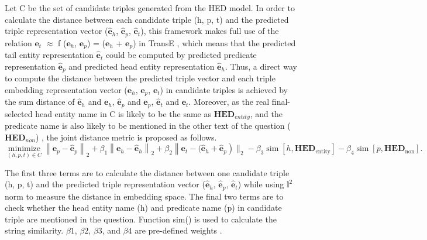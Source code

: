 \documentclass[11pt]{article}
\begin{document}
Let C be the set of candidate triples generated from the HED model. In order to calculate the distance between each candidate triple (h, p, t) and the predicted triple representation vector ($\hat{\mathbf{e}}_h$, $\hat{\mathbf{e}}_p$, $\hat{\mathbf{e}}_t$), this framework makes full use of the relation ${\mathbf{e}}_t$ $\approx$ f (${\mathbf{e}}_h$, ${\mathbf{e}}_p$) = (${\mathbf{e}}_h$ + ${\mathbf{e}}_p$) in TransE \cite{c22}, which means that the predicted tail entity representation $\hat{\mathbf{e}}_t$ could be computed by predicted predicate representation $\hat{\mathbf{e}}_p$ and predicted head entity representation $\hat{\mathbf{e}}_h$. Thus, a direct way to compute the distance between the predicted triple vector and each triple embedding representation vector (${\mathbf{e}}_h$, ${\mathbf{e}}_p$, ${\mathbf{e}}_t$) in candidate triples is achieved by the sum distance of $\hat{\mathbf{e}}_h$ and ${\mathbf{e}}_h$, $\hat{\mathbf{e}}_p$ and ${\mathbf{e}}_p$, $\hat{\mathbf{e}}_t$ and ${\mathbf{e}}_t$. Moreover, as the real final-selected head entity name in C is likely to be the same as ${\mathbf{HED}}_{entity}$, and the predicate name is also likely to be mentioned in the other text of the question (${\mathbf{HED}}_{non}$) \cite{c26}, the joint distance metric is proposed as follows.
\begin{equation}
    \underset{(h, p, t) \in C}{\operatorname{minimize}} \left\|\mathbf{e}_{p}-\hat{\mathbf{e}}_{p}\right\|_2+\beta_1\left\|\mathbf{e}_h-\hat{\mathbf{e}}_h\right\|_2+\beta_2\left\|\mathbf{e}_t-(\hat{\mathbf{e}}_{h} + \hat{\mathbf{e}}_{p}\right)\|_2 -\beta_3 \operatorname{sim}\left[h, \mathbf{HED}_{\text {entity}}\right]-\beta_4 \operatorname{sim}\left[p, \mathbf{HED}_{\text {non}}\right].
    \label{eq:prediction}
\end{equation}


The first three terms are to calculate the distance between one candidate triple (h, p, t) and the predicted triple representation vector ($\hat{\mathbf{e}}_{h}$, $\hat{\mathbf{e}}_p$, $\hat{\mathbf{e}}_{t}$) while using ${\mathbf{l}}^2$ norm to measure the distance in embedding space. The final two terms are to check whether the head entity name (h) and predicate name (p) in candidate triple are mentioned in the question. Function sim() is used to calculate the string similarity. $\beta1$, $\beta2$, $\beta3$, and $\beta4$ are pre-defined weights \cite{c26}.
\end{document}
